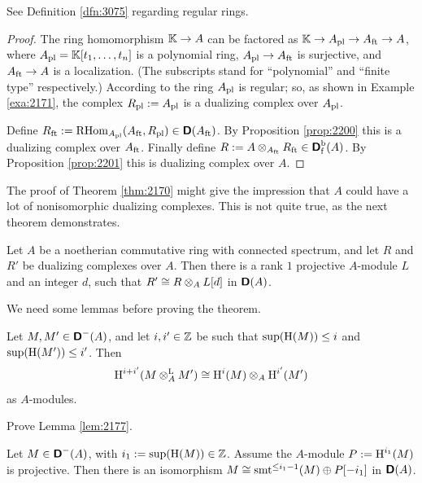 See Definition \ref{dfn:3075} regarding regular rings. 

\begin{proof}
The ring homomorphism $\mathbb{K} \to A$ can be factored as 
$\mathbb{K} \to A_{\mathrm{pl}} \to A_{\mathrm{ft}} \to A$, 
where $A_{\mathrm{pl}} = \mathbb{K}[t_1, \ldots, t_n]$ is a polynomial ring,
$A_{\mathrm{pl}} \to A_{\mathrm{ft}}$ is surjective, and $A_{\mathrm{ft}} \to A$ is a 
localization. (The subscripts stand for ``polynomial'' and ``finite type'' 
respectively.) According to \cite[Theorem 19.5]{Mats} the ring $A_{\mathrm{pl}}$ 
is regular; so, as shown in Example \ref{exa:2171}, the complex
$R_{\mathrm{pl}} := A_{\mathrm{pl}}$ is a dualizing complex over $A_{\mathrm{pl}}$. 

Define 
$R_{\mathrm{ft}} := \operatorname{RHom}_{A_{\mathrm{pl}}}(A_{\mathrm{ft}}, R_{\mathrm{pl}}) \in 
\boldsymbol{\mathsf{D}}(A_{\mathrm{ft}})$. 
By Proposition \ref{prop:2200} this is a 
dualizing complex over $A_{\mathrm{ft}}$. 
Finally define 
$R := A \otimes_{A_{\mathrm{ft}}} R_{\mathrm{ft}} \in \boldsymbol{\mathsf{D}}^{\mathrm{b}}_{\mathrm{f}}(A)$. 
By Proposition \ref{prop:2201} this is dualizing complex over $A$. 
\end{proof}

The proof of Theorem \ref{thm:2170} might give the impression that $A$ could 
have a lot of nonisomorphic dualizing complexes. This is not quite true, as the 
next theorem demonstrates. 

\begin{thm} \label{thm:2175}
Let $A$ be a noetherian commutative ring with connected spectrum, and let $R$ 
and $R'$ be dualizing complexes over $A$. Then there is a rank $1$ projective 
$A$-module $L$ and an integer $d$, such that 
$R' \cong R \otimes_A L[d]$ in $\boldsymbol{\mathsf{D}}(A)$. 
\end{thm}

We need some lemmas before proving the theorem. 

\begin{lem} \label{lem:2177} 
Let $M, M' \in  \boldsymbol{\mathsf{D}}^{-}(A)$, and let $i, i' \in \mathbb{Z}$ be such that 
$\operatorname{sup}(\operatorname{H}(M)) \leq i$ and $\operatorname{sup}(\operatorname{H}(M')) \leq i'$. 
Then 
\[ \operatorname{H}^{i + i'}(M \otimes^{\mathrm{L}}_A M') \cong 
\operatorname{H}^i(M) \otimes_A \operatorname{H}^{i'}(M')  \]
as $A$-modules. 
\end{lem}

\begin{exer} \label{exer:2178}
Prove Lemma \ref{lem:2177}.
\end{exer}

\begin{lem} \label{lem:2189} 
Let $M \in \boldsymbol{\mathsf{D}}^-(A)$, with $i_1 := \lb \opn{sup}(\opn{H}(M)) \in \Z$. 
Assume the $A$-module $P := \operatorname{H}^{i_1}(M)$ is projective. 
Then there is an isomorphism 
$M \cong \operatorname{smt}^{\leq i_1 - 1}(M) \oplus P[- i_1]$  
in $\boldsymbol{\mathsf{D}}(A)$. 
\end{lem}

